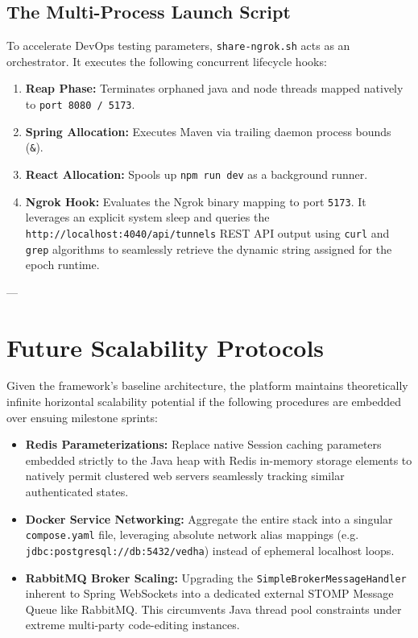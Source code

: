 \documentclass[12pt,a4paper]{article}
\begin{document}
\subsection{The Multi-Process Launch Script}
To accelerate DevOps testing parameters, \texttt{share-ngrok.sh} acts as an orchestrator. It executes the following concurrent lifecycle hooks:
\begin{enumerate}
    \item \textbf{Reap Phase:} Terminates orphaned java and node threads mapped natively to \texttt{port 8080 / 5173}.
    \item \textbf{Spring Allocation:} Executes Maven via trailing daemon process bounds (\texttt{\&}).
    \item \textbf{React Allocation:} Spools up \texttt{npm run dev} as a background runner.
    \item \textbf{Ngrok Hook:} Evaluates the Ngrok binary mapping to port \texttt{5173}. It leverages an explicit system sleep and queries the \texttt{http://localhost:4040/api/tunnels} REST API output using \texttt{curl} and \texttt{grep} algorithms to seamlessly retrieve the dynamic string assigned for the epoch runtime.
\end{enumerate}

---

\section{Future Scalability Protocols}
Given the framework's baseline architecture, the platform maintains theoretically infinite horizontal scalability potential if the following procedures are embedded over ensuing milestone sprints:

\begin{itemize}[leftmargin=*]
    \item \textbf{Redis Parameterizations:} Replace native Session caching parameters embedded strictly to the Java heap with Redis in-memory storage elements to natively permit clustered web servers seamlessly tracking similar authenticated states.
    \item \textbf{Docker Service Networking:} Aggregate the entire stack into a singular \texttt{compose.yaml} file, leveraging absolute network alias mappings (e.g. \texttt{jdbc:postgresql://db:5432/vedha}) instead of ephemeral localhost loops.
    \item \textbf{RabbitMQ Broker Scaling:} Upgrading the \texttt{SimpleBrokerMessageHandler} inherent to Spring WebSockets into a dedicated external STOMP Message Queue like RabbitMQ. This circumvents Java thread pool constraints under extreme multi-party code-editing instances.
\end{itemize}
\end{document}
